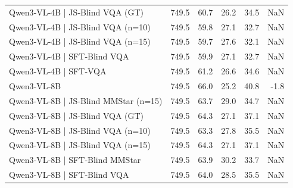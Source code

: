 \begin{tabular}{lrrrrr}
Qwen3‑VL‑4B | JS‑Blind VQA (GT) & 749.5 & 60.7 & 26.2 & 34.5 & NaN \\
Qwen3‑VL‑4B | JS‑Blind VQA (n=10) & 749.5 & 59.8 & 27.1 & 32.7 & NaN \\
Qwen3‑VL‑4B | JS‑Blind VQA (n=15) & 749.5 & 59.7 & 27.6 & 32.1 & NaN \\
Qwen3‑VL‑4B | SFT‑Blind VQA & 749.5 & 59.9 & 27.1 & 32.7 & NaN \\
Qwen3‑VL‑4B | SFT‑VQA & 749.5 & 61.2 & 26.6 & 34.6 & NaN \\
Qwen3‑VL‑8B & 749.5 & 66.0 & 25.2 & 40.8 & -1.8 \\
Qwen3‑VL‑8B | JS‑Blind MMStar (n=15) & 749.5 & 63.7 & 29.0 & 34.7 & NaN \\
Qwen3‑VL‑8B | JS‑Blind VQA (GT) & 749.5 & 64.3 & 27.1 & 37.1 & NaN \\
Qwen3‑VL‑8B | JS‑Blind VQA (n=10) & 749.5 & 63.3 & 27.8 & 35.5 & NaN \\
Qwen3‑VL‑8B | JS‑Blind VQA (n=15) & 749.5 & 64.3 & 27.1 & 37.1 & NaN \\
Qwen3‑VL‑8B | SFT‑Blind MMStar & 749.5 & 63.9 & 30.2 & 33.7 & NaN \\
Qwen3‑VL‑8B | SFT‑Blind VQA & 749.5 & 64.0 & 28.5 & 35.5 & NaN \\
\bottomrule
\end{tabular}
